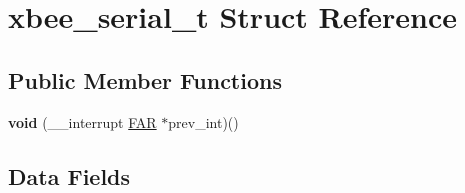 \hypertarget{structxbee__serial__t}{}\section{xbee\+\_\+serial\+\_\+t Struct Reference}
\label{structxbee__serial__t}
\subsection*{Public Member Functions}
\begin{DoxyCompactItemize}
\item 
{\bfseries void} (\+\_\+\+\_\+interrupt \hyperlink{group__hal_gaef060b3456fdcc093a7210a762d5f2ed}{F\+AR} $\ast$prev\+\_\+int)()
\end{DoxyCompactItemize}
\subsection*{Data Fields}
